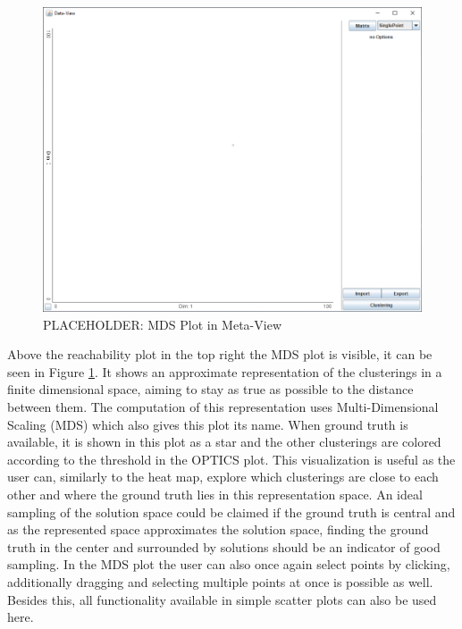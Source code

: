 \documentclass[
	a4paper,
	english,
	twoside,
	openright,               
	11pt                            
	]{report}
\begin{document}
\begin{figure}[h]
	\centering
	\includegraphics[scale=.45]{data-view}
	\caption{PLACEHOLDER: MDS Plot in Meta-View }
	\label{fig:mdsplot}
\end{figure}

Above the reachability plot in the top right the MDS plot is visible, it can be seen in Figure \ref{fig:mdsplot}. It shows an approximate representation of the clusterings in a finite dimensional space, aiming to stay as true as possible to the distance between them. The computation of this representation uses Multi-Dimensional Scaling (MDS) \cite{mds} which also gives this plot its name. When ground truth is available, it is shown in this plot as a star and the other clusterings are colored according to the threshold in the OPTICS plot. This visualization is useful as the user can, similarly to the heat map, explore which clusterings are close to each other and where the ground truth lies in this representation space. An ideal sampling of the solution space could be claimed if the ground truth is central and as the represented space approximates the solution space, finding the ground truth in the center and surrounded by solutions should be an indicator of good sampling. In the MDS plot the user can also once again select points by clicking, additionally dragging and selecting multiple points at once is possible as well. Besides this, all functionality available in simple scatter plots can also be used here.
\end{document}
